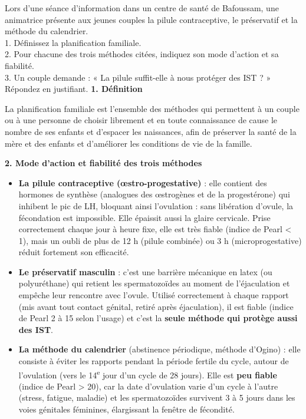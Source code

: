 \documentclass[11pt]{article}
\begin{document}
\begin{exoresolu}
Lors d'une séance d'information dans un centre de santé de Bafoussam, une animatrice présente aux jeunes couples la pilule contraceptive, le préservatif et la méthode du calendrier.\\
1. Définissez la planification familiale.\\
2. Pour chacune des trois méthodes citées, indiquez son mode d'action et sa fiabilité.\\
3. Un couple demande : « La pilule suffit-elle à nous protéger des IST ? » Répondez en justifiant.
\tcblower
\textbf{1. Définition}

La planification familiale est l'ensemble des méthodes qui permettent à un couple ou à une personne de choisir librement et en toute connaissance de cause le nombre de ses enfants et d'espacer les naissances, afin de préserver la santé de la mère et des enfants et d'améliorer les conditions de vie de la famille.

\textbf{2. Mode d'action et fiabilité des trois méthodes}

\begin{itemize}
\item \textbf{La pilule contraceptive (œstro-progestative)} : elle contient des hormones de synthèse (analogues des œstrogènes et de la progestérone) qui inhibent le pic de LH, bloquant ainsi l'ovulation : sans libération d'ovule, la fécondation est impossible. Elle épaissit aussi la glaire cervicale. Prise correctement chaque jour à heure fixe, elle est très fiable (indice de Pearl < 1), mais un oubli de plus de 12 h (pilule combinée) ou 3 h (microprogestative) réduit fortement son efficacité.
\item \textbf{Le préservatif masculin} : c'est une barrière mécanique en latex (ou polyuréthane) qui retient les spermatozoïdes au moment de l'éjaculation et empêche leur rencontre avec l'ovule. Utilisé correctement à chaque rapport (mis avant tout contact génital, retiré après éjaculation), il est fiable (indice de Pearl 2 à 15 selon l'usage) et c'est la \textbf{seule méthode qui protège aussi des IST}.
\item \textbf{La méthode du calendrier} (abstinence périodique, méthode d'Ogino) : elle consiste à éviter les rapports pendant la période fertile du cycle, autour de l'ovulation (vers le 14\textsuperscript{e} jour d'un cycle de 28 jours). Elle est \textbf{peu fiable} (indice de Pearl > 20), car la date d'ovulation varie d'un cycle à l'autre (stress, fatigue, maladie) et les spermatozoïdes survivent 3 à 5 jours dans les voies génitales féminines, élargissant la fenêtre de fécondité.
\end{itemize}


\end{exoresolu}
\end{document}

